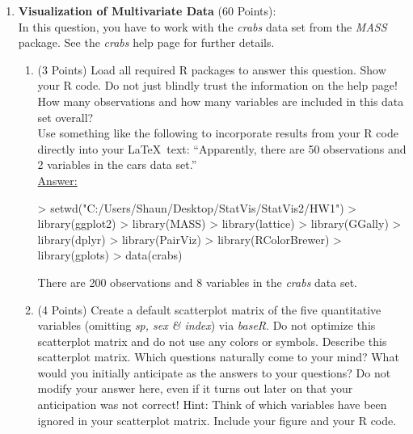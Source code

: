\documentclass[12pt,letterpaper,final]{article}
\begin{document}
\begin{enumerate}

\item {\bf Visualization of Multivariate Data} (60 Points): \\
In this question, you have to work with the {\it crabs} data set from the {\it MASS} package.
See the {\it crabs} help page for further details.

\begin{enumerate}
\item (3 Points) 
Load all required R packages to answer this question. Show your R code.
Do not just blindly trust the information on the help page! How many observations 
and how many variables are included 
in this data set overall? \\

Use something like the following to incorporate results from your R code directly
into your \LaTeX\ text:
``Apparently, there are 50 observations
and 2 variables
in the cars data set.'' \\


\underline{Answer:}
{\scriptsize
\begin{Schunk}
\begin{Sinput}
> setwd("C:/Users/Shaun/Desktop/StatVis/StatVis2/HW1")
> library(ggplot2)
> library(MASS)
> library(lattice)
> library(GGally)
> library(dplyr)
> library(PairViz)
> library(RColorBrewer)
> library(gplots)
> data(crabs)
\end{Sinput}
\end{Schunk}

There are 200 observations
and 8 variables
in the {\it crabs} data set. \\
}


\item (4 Points) 
Create a default scatterplot matrix 
of the five quantitative variables (omitting {\it sp, sex \& index})
via {\it baseR}. Do not optimize
this scatterplot matrix and do not use any colors or symbols.
Describe this scatterplot matrix. Which questions naturally come to your mind?
What would you initially anticipate as the answers to your questions?
Do not modify your answer here, even if it turns out later on that your
anticipation was not correct!
Hint: Think of which variables have been ignored in your scatterplot matrix.
Include your figure and your R code. \\



\end{enumerate}
\end{enumerate}
\end{document}
